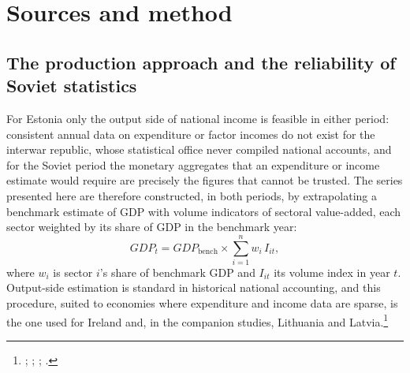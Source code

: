 \section{Sources and method}
\label{sec:method}

\subsection{The production approach and the reliability of Soviet statistics}

For Estonia only the output side of national income is feasible in either period: consistent annual data on expenditure or factor incomes do not exist for the interwar republic, whose statistical office never compiled national accounts, and for the Soviet period the monetary aggregates that an expenditure or income estimate would require are precisely the figures that cannot be trusted. The series presented here are therefore constructed, in both periods, by extrapolating a benchmark estimate of GDP with volume indicators of sectoral value-added, each sector weighted by its share of GDP in the benchmark year:
\[
    \mathit{GDP}_{t} = \mathit{GDP}_{\mathrm{bench}} \times \sum_{i=1}^{n} w_{i}\, I_{it},
\]
where $w_i$ is sector $i$'s share of benchmark GDP and $I_{it}$ its volume index in year $t$. Output-side estimation is standard in historical national accounting, and this procedure, suited to economies where expenditure and income data are sparse, is the one used for Ireland and, in the companion studies, Lithuania and Latvia.\footnote{\autocite[880--3]{kenny_irelandgdp}; \autocite[22--3]{broadberryinmorys}; \autocite{klimantas2023lithuania}; \autocite{Klimantas2024}.}

